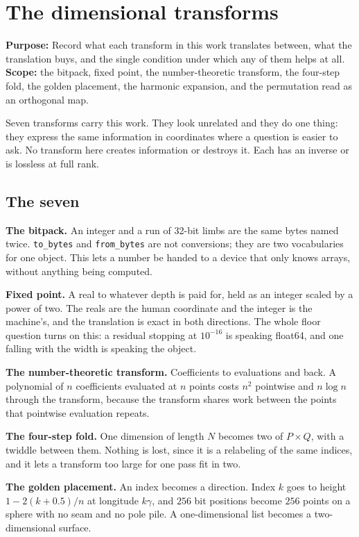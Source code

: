 \chapter{The dimensional transforms}

\textbf{Purpose:} Record what each transform in this work translates between, what the translation buys, and the single condition under which any of them helps at all. \textbf{Scope:} the bitpack, fixed point, the number-theoretic transform, the four-step fold, the golden placement, the harmonic expansion, and the permutation read as an orthogonal map.

Seven transforms carry this work. They look unrelated and they do one thing: they express the same information in coordinates where a question is easier to ask. No transform here creates information or destroys it. Each has an inverse or is lossless at full rank.

\section{The seven}

\textbf{The bitpack.} An integer and a run of 32-bit limbs are the same bytes named twice. \texttt{to\_bytes} and \texttt{from\_bytes} are not conversions; they are two vocabularies for one object. This lets a number be handed to a device that only knows arrays, without anything being computed.

\textbf{Fixed point.} A real to whatever depth is paid for, held as an integer scaled by a power of two. The reals are the human coordinate and the integer is the machine's, and the translation is exact in both directions. The whole floor question turns on this: a residual stopping at \(10^{-16}\) is speaking float64, and one falling with the width is speaking the object.

\textbf{The number-theoretic transform.} Coefficients to evaluations and back. A polynomial of \(n\) coefficients evaluated at \(n\) points costs \(n^2\) pointwise and \(n \log n\) through the transform, because the transform shares work between the points that pointwise evaluation repeats.

\textbf{The four-step fold.} One dimension of length \(N\) becomes two of \(P \times Q\), with a twiddle between them. Nothing is lost, since it is a relabeling of the same indices, and it lets a transform too large for one pass fit in two.

\textbf{The golden placement.} An index becomes a direction. Index \(k\) goes to height \(1 - 2(k + 0.5)/n\) at longitude \(k\gamma\), and \(256\) bit positions become \(256\) points on a sphere with no seam and no pole pile. A one-dimensional list becomes a two-dimensional surface.

